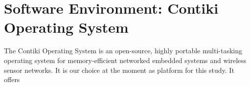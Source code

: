 \normalfont\normalsize
\chapter{Software Environment: Contiki Operating System}

The Contiki Operating System is an open-source, highly portable multi-tasking operating system for memory-efficient
networked embedded systems and wireless sensor networks. It is our choice at the moment as platform for this study. 
It offers 

